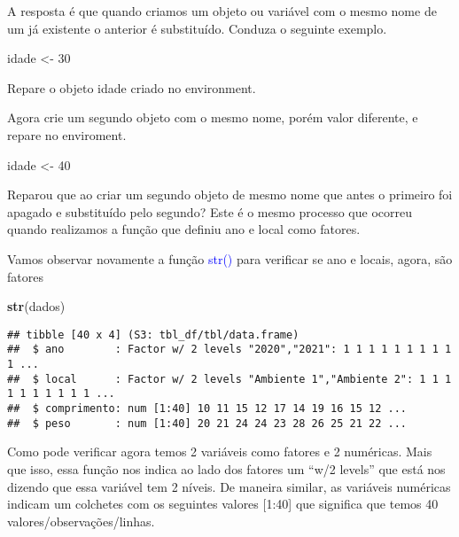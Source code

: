 \documentclass[titlepage, oneside, openany, a4paper]{book}
\newenvironment{Shaded}{\begin{snugshade}}{\end{snugshade}}
\newcommand{\DecValTok}[1]{\textcolor[rgb]{0.00,0.00,0.81}{#1}}
\newcommand{\KeywordTok}[1]{\textcolor[rgb]{0.13,0.29,0.53}{\textbf{#1}}}
\newcommand{\NormalTok}[1]{#1}
\newcommand{\StringTok}[1]{\textcolor[rgb]{0.31,0.60,0.02}{#1}}
\begin{document}
A resposta é que quando criamos um objeto ou variável com o mesmo nome de um já existente o anterior é substituído. Conduza o seguinte exemplo.

\begin{Shaded}
\begin{Highlighting}[]
\NormalTok{idade <-}\StringTok{ }\DecValTok{30}
\end{Highlighting}
\end{Shaded}

Repare o objeto idade criado no environment.

Agora crie um segundo objeto com o mesmo nome, porém valor diferente, e repare no enviroment.

\begin{Shaded}
\begin{Highlighting}[]
\NormalTok{idade <-}\StringTok{ }\DecValTok{40}
\end{Highlighting}
\end{Shaded}

Reparou que ao criar um segundo objeto de mesmo nome que antes o primeiro foi apagado e substituído pelo segundo? Este é o mesmo processo que ocorreu quando realizamos a função que definiu ano e local como fatores.

Vamos observar novamente a função \textcolor{blue}{str()} para verificar se ano e locais, agora, são fatores

\begin{Shaded}
\begin{Highlighting}[]
\KeywordTok{str}\NormalTok{(dados)}
\end{Highlighting}
\end{Shaded}

\begin{verbatim}
## tibble [40 x 4] (S3: tbl_df/tbl/data.frame)
##  $ ano        : Factor w/ 2 levels "2020","2021": 1 1 1 1 1 1 1 1 1 1 ...
##  $ local      : Factor w/ 2 levels "Ambiente 1","Ambiente 2": 1 1 1 1 1 1 1 1 1 1 ...
##  $ comprimento: num [1:40] 10 11 15 12 17 14 19 16 15 12 ...
##  $ peso       : num [1:40] 20 21 24 24 23 28 26 25 21 22 ...
\end{verbatim}

Como pode verificar agora temos 2 variáveis como fatores e 2 numéricas. Mais que isso, essa função nos indica ao lado dos fatores um ``w/2 levels'' que está nos dizendo que essa variável tem 2 níveis. De maneira similar, as variáveis numéricas indicam um colchetes com os seguintes valores {[}1:40{]} que significa que temos 40 valores/observações/linhas.
\end{document}
